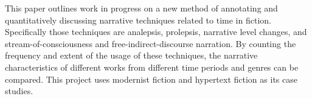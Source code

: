 This paper outlines work in progress on a new method of annotating and quantitatively discussing narrative techniques related to time in fiction. Specifically those techniques are analepsis, prolepsis, narrative level changes, and stream-of-consciousness and free-indirect-discourse narration. By counting the frequency and extent of the usage of these techniques, the narrative characteristics of different works from different time periods and genres can be compared. This project uses modernist fiction and hypertext fiction as its case studies.
